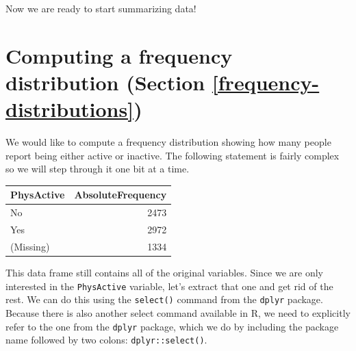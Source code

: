 \documentclass[12pt,]{book}
\newenvironment{Shaded}{\begin{snugshade}}{\end{snugshade}}
\newcommand{\CommentTok}[1]{\textcolor[rgb]{0.56,0.35,0.01}{\textit{#1}}}
\newcommand{\DataTypeTok}[1]{\textcolor[rgb]{0.13,0.29,0.53}{#1}}
\newcommand{\KeywordTok}[1]{\textcolor[rgb]{0.13,0.29,0.53}{\textbf{#1}}}
\newcommand{\NormalTok}[1]{#1}
\newcommand{\OperatorTok}[1]{\textcolor[rgb]{0.81,0.36,0.00}{\textbf{#1}}}
\newcommand{\StringTok}[1]{\textcolor[rgb]{0.31,0.60,0.02}{#1}}
\begin{document}
Now we are ready to start summarizing data!

\hypertarget{computing-a-frequency-distribution-section-reffrequency-distributions}{%
\section{Computing a frequency distribution (Section \ref{frequency-distributions})}\label{computing-a-frequency-distribution-section-reffrequency-distributions}}

We would like to compute a frequency distribution showing how many people report being either active or inactive. The following statement is fairly complex so we will step through it one bit at a time.

\begin{Shaded}
\end{Shaded}

\begin{tabular}{l|r}
\hline
PhysActive & AbsoluteFrequency\\
\hline
No & 2473\\
\hline
Yes & 2972\\
\hline
(Missing) & 1334\\
\hline
\end{tabular}

This data frame still contains all of the original variables. Since we are only interested in the \texttt{PhysActive} variable, let's extract that one and get rid of the rest. We can do this using the \texttt{select()} command from the \texttt{dplyr} package. Because there is also another select command available in R, we need to explicitly refer to the one from the \texttt{dplyr} package, which we do by including the package name followed by two colons: \texttt{dplyr::select()}.
\end{document}
